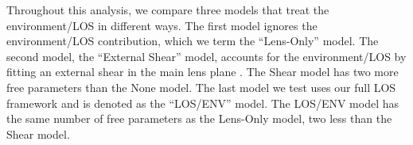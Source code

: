 Throughout this analysis, we compare three models that treat the environment/LOS in different ways. The first model ignores the environment/LOS contribution, which we term the ``Lens-Only'' model. The second model, the ``External Shear'' model, accounts for the environment/LOS by fitting an external shear in the main lens plane \citep[e.g.,][]{Suyu13}. The Shear model has two more free parameters than the None model. The last model we test uses our full LOS framework and is denoted as the ``LOS/ENV'' model. The LOS/ENV model has the same number of free parameters as the Lens-Only model, two less than the Shear model.
  